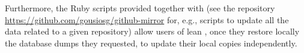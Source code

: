 Furthermore, the Ruby scripts provided together with \ght (see the \gh repository 
\url{https://github.com/gousiosg/github-mirror} for, e.g., scripts to update all the data related to a given repository) 
allow users of lean \ght, once they restore locally the database dumps they requested, 
to update their local copies independently.

